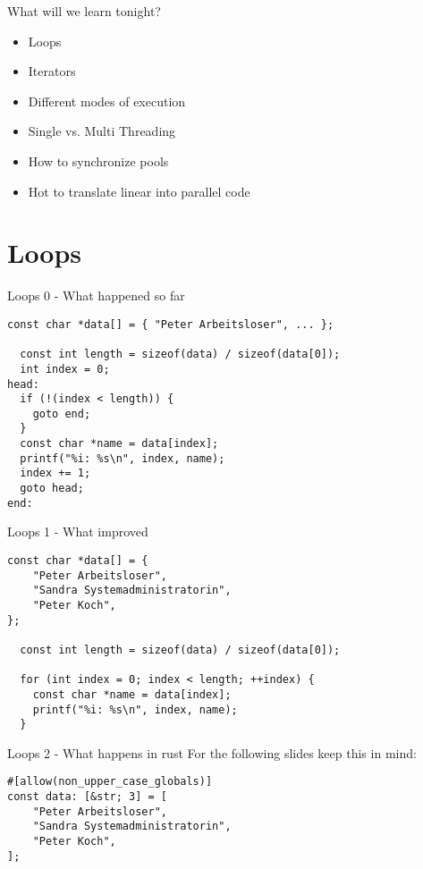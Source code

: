 \documentclass[aspectratio=1610,t]{beamer}
\begin{document}
\begin{frame}[fragile]{What will we learn tonight?}

\begin{itemize}
 \item Loops
 \item Iterators
 \item Different modes of execution
 \item Single vs. Multi Threading
 \item How to synchronize pools
 \item Hot to translate linear into parallel code
\end{itemize}

\end{frame}

{
\section{Loops}
}

\begin{frame}[fragile]{Loops 0 - What happened so far}
\begin{verbatim}
const char *data[] = { "Peter Arbeitsloser", ... };

  const int length = sizeof(data) / sizeof(data[0]);
  int index = 0;
head:
  if (!(index < length)) {
    goto end;
  }
  const char *name = data[index];
  printf("%i: %s\n", index, name);
  index += 1;
  goto head;
end:
\end{verbatim}
\end{frame}

\begin{frame}[fragile]{Loops 1 - What improved}
\begin{verbatim}
const char *data[] = {
    "Peter Arbeitsloser",
    "Sandra Systemadministratorin",
    "Peter Koch",
};

  const int length = sizeof(data) / sizeof(data[0]);

  for (int index = 0; index < length; ++index) {
    const char *name = data[index];
    printf("%i: %s\n", index, name);
  }
\end{verbatim}
\end{frame}

\begin{frame}[fragile]{Loops 2 - What happens in rust}
For the following slides keep this in mind:

\begin{verbatim}
#[allow(non_upper_case_globals)]
const data: [&str; 3] = [
    "Peter Arbeitsloser",
    "Sandra Systemadministratorin",
    "Peter Koch",
];
\end{verbatim}
\end{frame}
\end{document}
